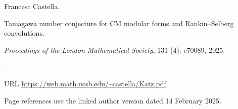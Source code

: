 Francesc Castella.

\newblock Tamagawa number conjecture for {CM} modular forms and
  {R}ankin--{S}elberg convolutions.

\newblock \emph{Proceedings of the London Mathematical Society}, 131
  (4): e70089, 2025.

\newblock {}.

\newblock URL \url{https://web.math.ucsb.edu/~castella/Katz.pdf}.

\newblock Page references use the linked author version dated 14 February 2025.
